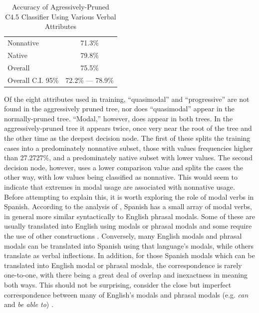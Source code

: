 \documentclass[main.tex]{subfiles}
\begin{document}
\begin{table}[htbp]
\centering
\caption{Accuracy of Agressively-Pruned C4.5 Classifier Using Various Verbal Attributes}
\begin{tabular}{l c}
\toprule
Nonnative & 71.3\% \\
Native & 79.8\% \\
Overall & 75.5\% \\
Overall C.I. 95\% & 72.2\% --- 78.9\%\\
\bottomrule
\end{tabular}
\label{table:pruned-basic-verb-results}
\end{table}
Of the eight attributes used in training, ``quasimodal'' and ``progressive'' are not found in the aggressively pruned tree, nor does ``quasimodal'' appear in the normally-pruned tree. ``Modal,'' however, does appear in both trees. In the aggressively-pruned tree it appears twice, once very near the root of the tree and the other time as the deepest decision node. The first of these splits the training cases into a predominately nonnative subset, those with values frequencies higher than 27.2727\%, and a predominately native subset with lower values. The second decision node, however, uses a lower comparison value and splits the cases the other way, with low values being classified as nonnative. This would seem to indicate that extremes in modal usage are associated with nonnative usage. Before attempting to explain this, it is worth exploring the role of modal verbs in Spanish. According to the analysis of \citet{butt}, Spanish has a small array of modal verbs, in general more similar syntactically to English phrasal modals. Some of these are usually translated into English using modals or phrasal modals and some require the use of other constructions \citep[ch. 21]{butt}. Conversely, many English modals and phrasal modals can be translated into Spanish using that language's modals, while others translate as verbal inflections. In addition, for those Spanish modals which can be translated into English modal or phrasal modals, the correspondence is rarely one-to-one, with there being a great deal of overlap and inexactness in meaning both ways. This should not be surprising, consider the close but imperfect correspondence between many of English's modals and phrasal modals (e.g. \textit{can} and \textit{be able to}) \citep[ch. 8]{celce-murcia:1999}.
\end{document}
